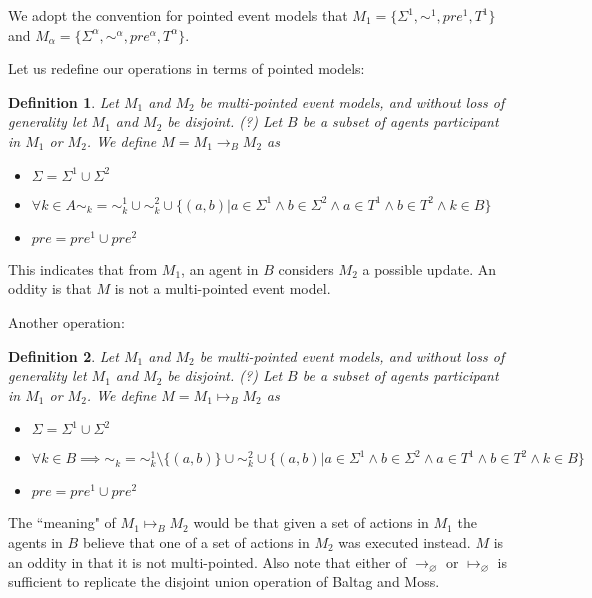 \documentclass[12pt, a4paper, titlepage]{scrartcl}
\newtheorem{defn}{Definition}
\begin{document}
We adopt the convention for pointed event models that $M_1 = \{\Sigma^1, \sim^1,
pre^1, T^1\}$ and $M_\alpha = \{\Sigma^\alpha,\sim^\alpha,pre^\alpha,T^\alpha\}$.

Let us redefine our operations in terms of pointed models:
\begin{defn} \label{possOne}
Let $M_1$ and $M_2$ be multi-pointed event models, and without loss of
generality let $M_1$ and $M_2$ be disjoint. (?)
Let $B$ be a subset of agents participant in $M_1$ or $M_2$.
We define $M = M_1 \to_B M_2$ as 
\begin{itemize}
  \item $\Sigma = \Sigma^1 \cup \Sigma^2$
  \item $\forall k \in A \sim_k = \sim^1_k \cup \sim^2_k \cup \{(a, b) | a \in \Sigma^1 \land b \in
  \Sigma^2 \land a \in T^1 \land b \in T^2 \land k \in B\}$
  \item $pre = pre^1 \cup pre^2$
\end{itemize}
\end{defn}

This indicates that from $M_1$, an agent in $B$ considers $M_2$ a possible
update.
An oddity is that $M$ is not a multi-pointed event model.

Another operation:
\begin{defn} \label{possTwo}
Let $M_1$ and $M_2$ be multi-pointed event models, and without loss of
generality let $M_1$ and $M_2$ be disjoint. (?)
Let $B$ be a subset of agents participant in $M_1$ or $M_2$.
We define $M = M_1 \mapsto_B M_2$ as 
\begin{itemize}
  \item $\Sigma = \Sigma^1 \cup \Sigma^2$
  \item $\forall k \in B \implies \sim_k = \sim^1_k \setminus \{ (a,b) \} \cup \sim^2_k \cup \{(a, b) | a \in \Sigma^1 \land b \in
  \Sigma^2 \land a \in T^1 \land b \in T^2 \land k \in B \}$
  \item $pre = pre^1 \cup pre^2$
\end{itemize}
\end{defn}

The ``meaning" of $M_1 \mapsto_B M_2$ would be that given a set of actions in
$M_1$ the agents in $B$ believe that one of a set of actions in $M_2$ was
executed instead.
$M$ is an oddity in that it is not multi-pointed.
Also note that either of $\to_\varnothing$ or $\mapsto_\varnothing$ is
sufficient to replicate the disjoint union operation of Baltag and Moss.
\end{document}

